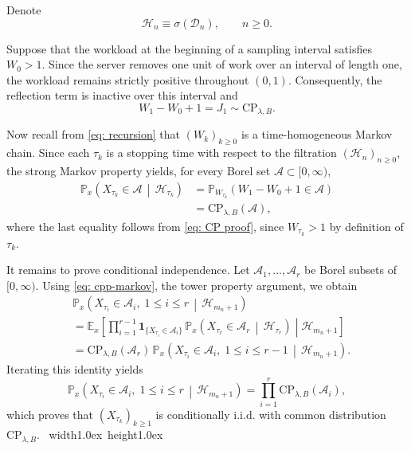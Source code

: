 \documentclass[12pt]{article}
\newcommand{\1}{\mathbf{1}}
\def\endpf{{\ \hfill\hbox{\vrule width1.0ex height1.0ex}\parfillskip 0pt
	}}
\newenvironment{proof}{\noindent{\bf Proof:}}{\endpf}
\begin{document}
\begin{proof}
Denote 
\[
\mathcal H_n\equiv
\sigma(\mathcal{D}_n),
\qquad n\ge0.
\]

Suppose that the workload at the beginning of a sampling interval satisfies
${W_0>1}$.
Since the server removes one unit of work over an interval of length one, the workload remains strictly positive throughout $(0,1)$.
Consequently, the reflection term is inactive over this interval and
\begin{equation}\label{eq: CP proof}
W_1-W_0+1
=
J_1
\sim
\mathrm{CP}_{\lambda,B}.
\end{equation}

Now recall from \eqref{eq: recursion} that
$(W_k)_{k\ge0}$
is a time-homogeneous Markov chain.
Since each $\tau_k$ is a stopping time with respect to the filtration
$(\mathcal H_n)_{n\ge0}$,
the strong Markov property yields, for every Borel set
$\mathcal A\subset[0,\infty)$,
\begin{align}
\mathbb P_x
\!\left(
X_{\tau_k}\in \mathcal A
\,\middle|\,
\mathcal H_{\tau_k}
\right)
&=
\mathbb P_{W_{\tau_k}}
\!\left(
W_1-W_0+1\in \mathcal A
\right)
\nonumber\\
&=
\mathrm{CP}_{\lambda,B}(\mathcal A),
\label{eq: cpp-markov}
\end{align}
where the last equality follows from \eqref{eq: CP proof}, since
$W_{\tau_k}>1$
by definition of $\tau_k$.

It remains to prove conditional independence.
Let
$\mathcal A_1,\ldots,\mathcal A_r$
be Borel subsets of $[0,\infty)$.
Using \eqref{eq: cpp-markov}, the tower property argument, we obtain
\begin{align*}
&
\mathbb P_x
\left(
X_{\tau_i}\in\mathcal  A_i,\;
1\le i\le r
\,\middle|\,
\mathcal H_{m_n+1}
\right)
\\
&=
\mathbb E_x
\left[
\prod_{i=1}^{r-1}
\mathbf1_{\{X_{\tau_i}\in \mathcal A_i\}}
\,
\mathbb P_x
\left(
X_{\tau_r}\in \mathcal A_r
\,\middle|\,
\mathcal H_{\tau_r}
\right)
\middle|
\mathcal H_{m_n+1}
\right]
\\
&=
\mathrm{CP}_{\lambda,B}(\mathcal A_r)\,
\mathbb P_x
\left(
X_{\tau_i}\in \mathcal A_i,\;
1\le i\le r-1
\,\middle|\,
\mathcal H_{m_n+1}
\right).
\end{align*}
Iterating this identity yields
\[
\mathbb P_x
\left(
X_{\tau_i}\in \mathcal A_i,\;
1\le i\le r
\,\middle|\,
\mathcal H_{m_n+1}
\right)
=
\prod_{i=1}^{r}
\mathrm{CP}_{\lambda,B}(\mathcal A_i),
\]
which proves that
$(X_{\tau_k})_{k\ge1}$
is conditionally i.i.d. with common distribution
$\mathrm{CP}_{\lambda,B}$.
\end{proof}
\end{document}
